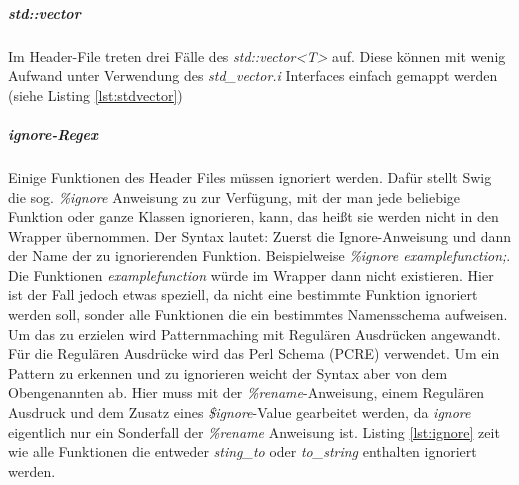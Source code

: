 \begin{code}[caption={std::map},label={lst:stdmap}, escapechar=|]

	

\end{code}

\subparagraph{std::vector}

Im Header-File treten drei Fälle des \emph{std::vector<T>} auf. Diese können mit wenig Aufwand unter Verwendung des \emph{std\_vector.i} Interfaces einfach gemappt werden (siehe Listing \ref{lst:stdvector})

\begin{code}[caption={std::vector},label={lst:stdvector}, escapechar=|]

\end{code}

\subparagraph{ignore-Regex}
Einige Funktionen des Header Files müssen ignoriert werden. Dafür stellt Swig die sog. \emph{\%ignore} Anweisung zu zur Verfügung, mit der man jede beliebige Funktion oder ganze Klassen ignorieren, kann, das heißt sie werden nicht in den Wrapper übernommen. Der Syntax lautet: Zuerst die Ignore-Anweisung und dann der Name der zu ignorierenden Funktion. Beispielweise \emph{\%ignore examplefunction;}. Die Funktionen \emph{examplefunction} würde im Wrapper dann nicht existieren. Hier ist der Fall jedoch etwas speziell, da nicht eine bestimmte Funktion ignoriert werden soll, sonder alle Funktionen die ein bestimmtes Namensschema aufweisen. Um das zu erzielen wird Patternmaching mit Regulären Ausdrücken angewandt. Für die Regulären Ausdrücke wird das Perl Schema (PCRE) verwendet. Um ein Pattern zu erkennen und zu ignorieren weicht der Syntax aber von dem Obengenannten ab. Hier muss mit der \emph{\%rename}-Anweisung, einem Regulären Ausdruck und dem Zusatz eines \emph{\$ignore}-Value gearbeitet werden, da \emph{ignore} eigentlich nur ein Sonderfall der \emph{\%rename} Anweisung ist.
Listing \ref{lst:ignore} zeit wie alle Funktionen die entweder \emph{sting\_to} oder \emph{to\_string} enthalten ignoriert werden.

